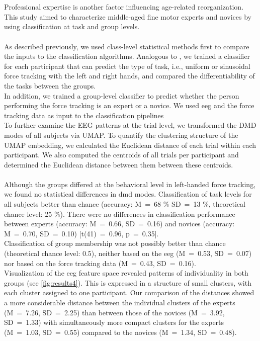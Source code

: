 \hyperref[pub:paperIV]{}\\
\\
Professional expertise is another factor influencing age-related reorganization. This study aimed to characterize middle-aged fine motor experts and novices by using classification at task and group levels.\\
\\
As described previously, we used class-level statistical methods first to compare the inputs to the classification algorithms. Analogous to , we trained a classifier for each participant that can predict the type of task, i.e., uniform or sinusoidal force tracking with the left and right hands, and compared the differentiability of the tasks between the groups.\\
In addition, we trained a group-level classifier to predict whether the person performing the force tracking is an expert or a novice. We used \gls{eeg} and the force tracking data as input to the classification pipelines\\
To further examine the EEG patterns at the trial level, we transformed the DMD modes of all subjects via UMAP. To quantify the clustering structure of the UMAP embedding, we calculated the Euclidean distance of each trial within each participant. We also computed the centroids of all trials per participant and determined the Euclidean distance between them between these centroids.\\
\\
Although the groups differed at the behavioral level in left-handed force tracking, we found no statistical differences in \gls{dmd} modes. Classification of task levels for all subjects better than chance (accuracy: M~=~68 \% SD~=~13 \%, theoretical chance level: 25 \%). There were no differences in classification performance between experts (accuracy: M~=~0.66, SD~=~0.16) and novices (accuracy: M~=~0.70, SD~=~0.10) [t(41)~=~0.96, p~=~0.35].\\
Classification of group membership was not possibly better than chance (theoretical chance level: 0.5), neither based on the \gls{eeg} (M~=~0.53, SD~=~0.07) nor based on the force tracking data (M~=~0.43, SD~=~0.16).\\
Visualization of the \gls{eeg} feature space revealed patterns of individuality in both groups (see \autoref{fig:results4}). This is expressed in a structure of small clusters, with each cluster assigned to one participant. Our comparison of the distances showed a more considerable distance between the individual clusters of the experts (M~=~7.26, SD~=~2.25) than between those of the novices (M~=~3.92, SD~=~1.33) with simultaneously more compact clusters for the experts (M~=~1.03, SD~=~0.55) compared to the novices (M~=~1.34, SD~=~0.48).  

